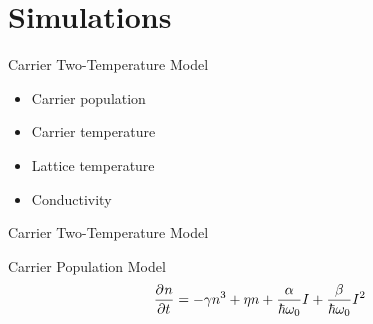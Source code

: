 \documentclass[aspectratio=169, 10pt]{beamer}
\begin{document}

\section{Simulations}

\begin{frame}{Carrier Two-Temperature Model}
  \begin{minipage}{0.33\textwidth}
    \begin{itemize}
      \item Carrier population
      \item Carrier temperature
      \item Lattice temperature
      \item Conductivity
    \end{itemize}
  \end{minipage} \hfill
  \begin{minipage}{0.66\textwidth}
    \centering
    \resizebox{\textwidth}{!}{}
  \end{minipage}
\end{frame}


\begin{frame}{Carrier Two-Temperature Model}
   \begin{block}{Carrier Population Model}
    \begin{equation}
      \pdv[]{n}{t}=-\gamma n^3 + \eta n + \frac{\alpha}{\hbar\omega_0}I + \frac{\beta}{\hbar\omega_0}I^2
    \end{equation}
  \end{block}
  \begin{minipage}{0.28\textwidth}
    \centering
    \resizebox{\textwidth}{!}{}
  \end{minipage}\hfill
  \begin{minipage}{0.28\textwidth}
    \centering
    \resizebox{\textwidth}{!}{}
  \end{minipage}\hfill
  \begin{minipage}{0.30\textwidth}
    \centering
    \resizebox{\textwidth}{!}{}
  \end{minipage}
\end{frame}
\end{document}
